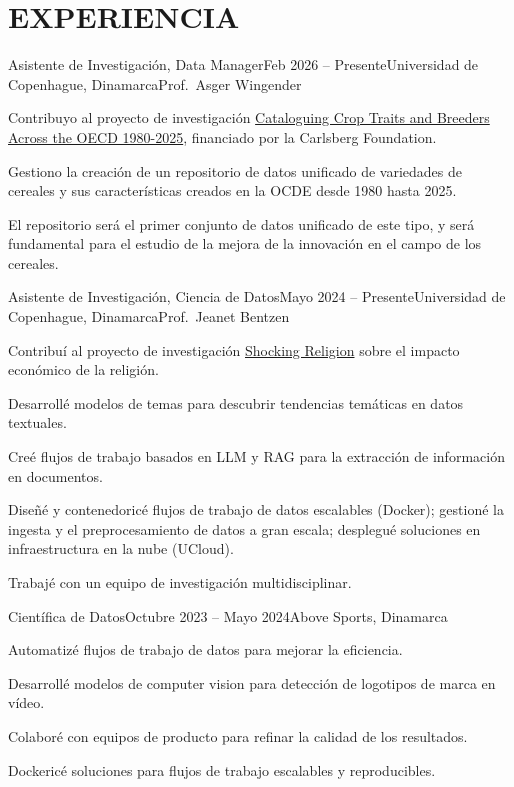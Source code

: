 \documentclass{resume}
\begin{document}
\section{EXPERIENCIA}
\begin{content}

    \begin{position}{Asistente de Investigación, Data Manager}{Feb 2026 -- Presente}{Universidad de Copenhague, Dinamarca}{Prof.~Asger Wingender}{}
        \item Contribuyo al proyecto de investigación {\href{https://www.carlsbergfondet.dk/en/what-we-have-funded/cf25-1677/}{Cataloguing Crop Traits and Breeders Across the OECD 1980-2025}}, financiado por la Carlsberg Foundation.
        \item Gestiono la creación de un repositorio de datos unificado de variedades de cereales y sus características creados en la OCDE desde 1980 hasta 2025.
        \item El repositorio será el primer conjunto de datos unificado de este tipo, y será fundamental para el estudio de la mejora de la innovación en el campo de los cereales.
    \end{position}

    \begin{position}{Asistente de Investigación, Ciencia de Datos}{Mayo 2024 -- Presente}{Universidad de Copenhague, Dinamarca}{Prof.~Jeanet Bentzen}{}
        \item Contribuí al proyecto de investigación {\href{https://www.economics.ku.dk/research/externally-funded-research_new/shocking-religion/}{Shocking Religion}} sobre el impacto económico de la religión.
        \item Desarrollé modelos de temas para descubrir tendencias temáticas en datos textuales.
        \item Creé flujos de trabajo basados en LLM y RAG para la extracción de información en documentos.
        \item Diseñé y contenedoricé flujos de trabajo de datos escalables (Docker); gestioné la ingesta y el preprocesamiento de datos a gran escala; desplegué soluciones en infraestructura en la nube (UCloud).
        \item Trabajé con un equipo de investigación multidisciplinar.
    \end{position}
    
    \begin{position}{Científica de Datos}{Octubre 2023 -- Mayo 2024}{Above Sports, Dinamarca}{}{ }
        \item Automatizé flujos de trabajo de datos para mejorar la eficiencia.
        \item Desarrollé modelos de computer vision para detección de logotipos de marca en vídeo.
        \item Colaboré con equipos de producto para refinar la calidad de los resultados.
        \item Dockericé soluciones para flujos de trabajo escalables y reproducibles.
    \end{position}
    

\end{content}
\end{document}
